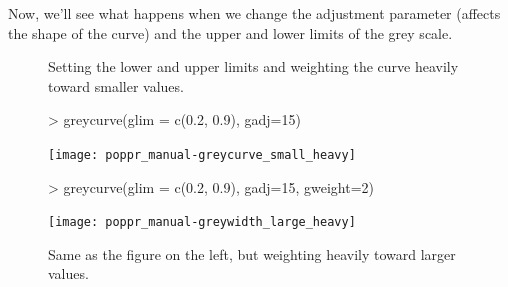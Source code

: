\documentclass[letterpaper]{article}
\begin{document}
Now, we'll see what happens when we change the adjustment parameter (affects the shape of the curve) and the upper and lower limits of the grey scale.

\begin{figure}[h!]
\begin{minipage}[b]{0.45\linewidth}
\centering
\caption{\footnotesize Setting the lower and upper limits and weighting the curve heavily toward smaller values.}
\begin{Schunk}
\begin{Sinput}
> greycurve(glim = c(0.2, 0.9), gadj=15)
\end{Sinput}
\end{Schunk}
\texttt{[image: poppr\_manual-greycurve\_small\_heavy]}
\end{minipage}
\hspace{0.5cm}
\begin{minipage}[b]{0.45\linewidth}
\centering
\caption{\footnotesize Same as the figure on the left, but weighting heavily toward larger values.}
\begin{Schunk}
\begin{Sinput}
> greycurve(glim = c(0.2, 0.9), gadj=15, gweight=2)
\end{Sinput}
\end{Schunk}
\texttt{[image: poppr\_manual-greywidth\_large\_heavy]}
\end{minipage}
\end{figure}
\newpage
\end{document}
